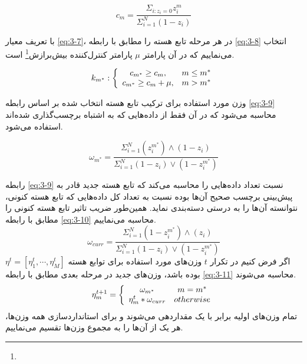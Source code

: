 \documentclass[12pt,twocolumn]{article}
\newcommand{\enfootnote}[1]{\footnote{\lr{#1}}}
\begin{document}
\begin{equation}
c_m = \frac{\Sigma_{i:z_i=0}z_i^m}{\Sigma_{i=1}^N (1 - z_i)}
\label{eq:3-7}
\end{equation}

با تعریف معیار \eqref{eq:3-7}، در هر مرحله تابع هسته را مطابق با رابطه \eqref{eq:3-8} انتخاب می‌نماییم که در آن پارامتر $\mu$ پارامتر کنترل‌کننده بیش‌برازش\enfootnote{Overfitting} است.

\begin{equation}
k_{m^*} : \left\lbrace \begin{array}{c c}
c_{m^*} \geq c_m, & m \leq m^* \\
c_{m^*} \geq c_m + \mu, & m > m^* 
\end{array} \right.
\label{eq:3-8}
\end{equation}

وزن مورد استفاده برای ترکیب تابع هسته انتخاب شده بر اساس رابطه \eqref{eq:3-9} محاسبه می‌شود که در آن فقط از داده‌هایی که به اشتباه برچسب‌گذاری شده‌اند استفاده می‌شود.

\begin{equation}
\omega_{m^*} = \frac{\Sigma_{i=1}^N (z_i^{m^*}) \wedge (1-z_i) }{\Sigma_{i=1}^N (1-z_i) \vee (1-z_i^{m^*})}
\label{eq:3-9}
\end{equation}

رابطه \eqref{eq:3-9} نسبت تعداد داده‌هایی را محاسبه می‌کند که تابع هسته جدید قادر به پیش‌بینی برچسب صحیح آن‌ها بوده نسبت به تعداد کل داده‌هایی که تابع هسته کنونی، نتوانسته آن‌ها را به درستی دسته‌بندی نماید. همین‌طور ضریب تاثیر تابع هسته کنونی را مطابق با رابطه \eqref{eq:3-10} محاسبه می‌نماییم.
\begin{equation}
\omega_{curr} = \frac{\Sigma_{i=1}^N (1-z_i^{m^*}) \wedge (z_i) }{\Sigma_{i=1}^N (1-z_i) \vee (1-z_i^{m^*})}
\label{eq:3-10}
\end{equation}
اگر فرض کنیم در تکرار $t$ وزن‌های مورد استفاده برای توابع هسته $\eta^t = [\eta_1^t, \cdots, \eta_M^t]$ بوده باشد، وزن‌های جدید در مرحله بعدی مطابق با رابطه \eqref{eq:3-11} محاسبه می‌شوند.
\begin{equation}
\eta_m^{t+1} = \left\lbrace \begin{array}{c c}
\omega_{m^*} & m = m^* \\
\eta_m^t * \omega_{curr} & otherwise
\end{array}\right.
\label{eq:3-11}
\end{equation}
تمام وزن‌های اولیه برابر با یک مقداردهی می‌شوند و برای استانداردسازی همه وزن‌ها، هر یک از آن‌ها را به مجموع وزن‌ها تقسیم می‌نماییم.
\end{document}
